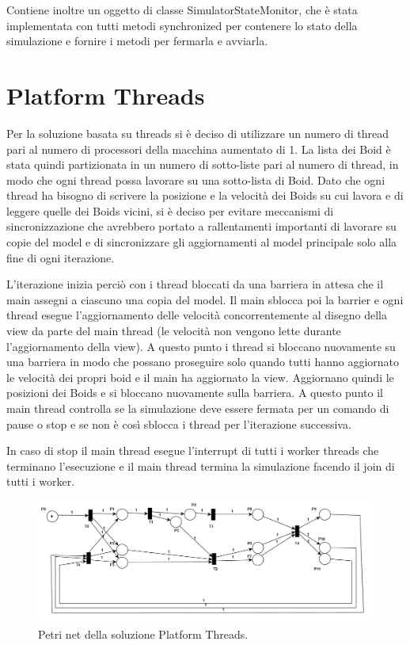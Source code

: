 \documentclass[11pt,notitlepage]{article}
\begin{document}
Contiene inoltre un oggetto di classe \textsf{SimulatorStateMonitor}, che è stata implementata con tutti metodi \textsf{synchronized} per contenere lo stato della simulazione
e fornire i metodi per fermarla e avviarla.

\section{Platform Threads}
Per la soluzione basata su threads si è deciso di utilizzare un numero di thread pari al numero di processori della macchina aumentato di 1. La lista dei Boid è stata
quindi partizionata in un numero di sotto-liste pari al numero di thread, in modo che ogni thread possa lavorare su una sotto-lista di Boid.
Dato che ogni thread ha bisogno di scrivere la posizione e la velocità dei Boids su cui lavora e di leggere quelle dei Boids vicini, si è deciso per evitare meccanismi di 
sincronizzazione che avrebbero portato a rallentamenti importanti di lavorare su copie del model e di sincronizzare gli aggiornamenti al model principale solo alla fine di ogni
iterazione.

L'iterazione inizia perciò con i thread bloccati da una barriera in attesa che il main assegni a ciascuno una copia del model. Il main sblocca poi la barrier e ogni
thread esegue l'aggiornamento delle velocità concorrentemente al disegno della view da parte del main thread (le velocità non vengono lette durante l'aggiornamento della view).
A questo punto i thread si bloccano nuovamente su una barriera in modo che possano proseguire solo quando tutti hanno aggiornato le velocità dei propri boid e il main ha aggiornato
la view. Aggiornano quindi le posizioni dei Boids e si bloccano nuovamente sulla barriera. A questo punto il main thread controlla se la simulazione deve essere fermata per un comando
di pause o stop e se non è così sblocca i thread per l'iterazione successiva.

In caso di stop il main thread esegue l'interrupt di tutti i worker threads che terminano l'esecuzione e il main thread termina la simulazione facendo il join di tutti i worker.

\begin{figure}[H]
    \centering
    \includegraphics[width=\textwidth]{Petri net 1.png}
    \caption{Petri net della soluzione Platform Threads.}
    \label{fig:platform-threads-diagram}
\end{figure}
\end{document}
